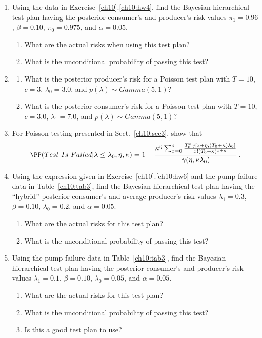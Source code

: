 \documentclass {book}
\begin{document}
\begin{enumerate}[\ref{ch10}.1]
\item Using the data in Exercise~\ref{ch10}.\ref{ch10:hw4}, find
the Bayesian hierarchical test plan having the posterior
consumer's and producer's risk values $\pi_{1} = 0.96$, $\beta =
0.10$, $\pi_{0} = 0.975$, and $\alpha = 0.05$.
\begin{enumerate} \item What are the actual risks when using this test
plan? \item What is the unconditional probability of passing this
test?\end{enumerate}

\item \label{ch10:exr4} \begin{enumerate} \item What is the
posterior producer's risk for a Poisson test plan with $T = 10$,
$c = 3$, $\lambda_0 = 3.0$, and $p(\lambda) \sim Gamma(5,1)$?
\item What is the posterior consumer's risk for a Poisson test
plan with $T = 10$, $c = 3.0$, $\lambda_1 = 7.0$, and $p(\lambda)
\sim Gamma(5,1)$?
\end{enumerate}

\item \label{ch10:hw6} For Poisson testing
presented in Sect.~\ref{ch10:sec3}, show that
\begin{displaymath}
\PP(Test\mbox{ }Is\mbox{
}Failed|\lambda\leq\lambda_{0},\eta,\kappa) =
1-\frac{\kappa^{\eta}\sum^{c}_{x=0}
\frac{T_{0}^{x}\gamma[x+\eta,(T_{0}+\kappa)\lambda_{0}]}
{x!(T_{0}+\kappa)^{x+\eta}}}{\gamma(\eta,\kappa\lambda_{0})} \, .
\end{displaymath}

\item Using the expression given in
Exercise~\ref{ch10}.\ref{ch10:hw6} and the pump failure data in
Table~\ref{ch10:tab3}, find the Bayesian hierarchical test plan
having the ``hybrid'' posterior consumer's and average producer's
risk values $\lambda_{1} = 0.3$, $\beta = 0.10$, $\lambda_{0}=
0.2$, and $\alpha = 0.05$. \begin{enumerate} \item What are the
actual risks for this test plan? \item What is the unconditional
probability of passing this test?\end{enumerate}

\item Using the pump failure data in Table~\ref{ch10:tab3}, find
the Bayesian hierarchical test plan having the posterior
consumer's and producer's risk values $\lambda_{1} = 0.1$, $\beta
= 0.10$, $\lambda_{0}= 0.05$, and $\alpha = 0.05$.
\begin{enumerate} \item What are the actual risks for this test plan? \item What is
the unconditional probability of passing this test? \item Is this
a good test plan to use?\end{enumerate}


\end{enumerate}
\end{document}
